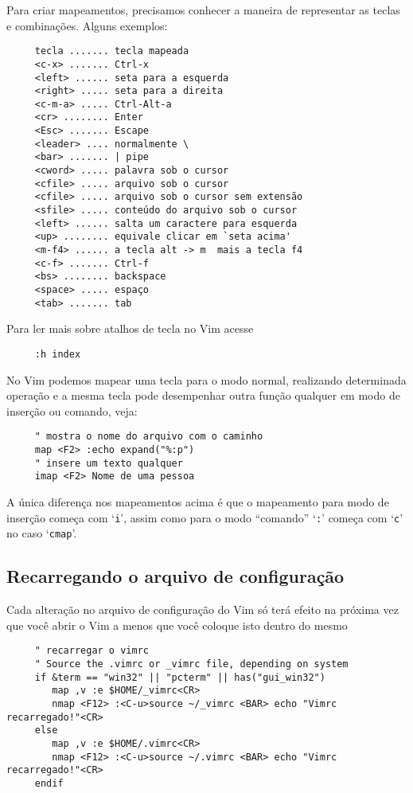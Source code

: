 Para criar mapeamentos, precisamos conhecer a maneira de representar
as teclas e combinações. Alguns exemplos:

\begin{verbatim}
     tecla ....... tecla mapeada
     <c-x> ....... Ctrl-x
     <left> ...... seta para a esquerda
     <right> ..... seta para a direita
     <c-m-a> ..... Ctrl-Alt-a
     <cr> ........ Enter
     <Esc> ....... Escape
     <leader> .... normalmente \
     <bar> ....... | pipe
     <cword> ..... palavra sob o cursor
     <cfile> ..... arquivo sob o cursor
     <cfile> ..... arquivo sob o cursor sem extensão
     <sfile> ..... conteúdo do arquivo sob o cursor
     <left> ...... salta um caractere para esquerda
     <up> ........ equivale clicar em `seta acima'
     <m-f4> ...... a tecla alt -> m  mais a tecla f4
     <c-f> ....... Ctrl-f
     <bs> ........ backspace
     <space> ..... espaço
     <tab> ....... tab
\end{verbatim}

Para ler mais sobre atalhos de tecla no Vim acesse 

\begin{verbatim}
     :h index
\end{verbatim}

No Vim podemos mapear uma tecla para o modo normal, realizando
determinada operação e a mesma tecla pode desempenhar outra função
qualquer em modo de inserção ou comando, veja:

\begin{verbatim}
     " mostra o nome do arquivo com o caminho
     map <F2> :echo expand("%:p")
     " insere um texto qualquer
     imap <F2> Nome de uma pessoa
\end{verbatim}

A única diferença nos mapeamentos acima é que o mapeamento para modo
de inserção começa com `{\tt i}', assim como para o modo ``comando'' `{\tt :}' começa
com `{\tt c}' no caso `{\tt cmap}'.

\subsection{Recarregando o arquivo de configuração}
\label{sec:Recarregando o arquivo de configuração}

Cada alteração no arquivo de configuração do Vim só terá efeito na próxima vez que você
abrir o Vim a menos que você coloque isto dentro do mesmo

\begin{verbatim}
     " recarregar o vimrc
     " Source the .vimrc or _vimrc file, depending on system
     if &term == "win32" || "pcterm" || has("gui_win32")
        map ,v :e $HOME/_vimrc<CR>
        nmap <F12> :<C-u>source ~/_vimrc <BAR> echo "Vimrc recarregado!"<CR>
     else
        map ,v :e $HOME/.vimrc<CR>
        nmap <F12> :<C-u>source ~/.vimrc <BAR> echo "Vimrc recarregado!"<CR>
     endif
\end{verbatim}

